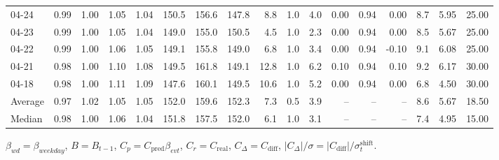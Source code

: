 \begin{threeparttable}
{\begin{tabular}{lrrrrrrrrrrrrrrrr}
  04-24 &         0.99 &           1.00 &          1.05 &          1.04 & 150.5 & 156.6 & 147.8 &        8.8 &                      1.0 &                 4.0 &       0.00 &      0.94 &           0.00 &              8.7 &            5.95 &                  25.00 \\
  04-23 &         0.99 &           1.00 &          1.05 &          1.04 & 149.0 & 155.0 & 150.5 &        4.5 &                      1.0 &                 2.3 &       0.00 &      0.94 &           0.00 &              8.5 &            5.67 &                  25.00 \\
  04-22 &         0.99 &           1.00 &          1.06 &          1.05 & 149.1 & 155.8 & 149.0 &        6.8 &                      1.0 &                 3.4 &       0.00 &      0.94 &          -0.10 &              9.1 &            6.08 &                  25.00 \\
  04-21 &         0.98 &           1.00 &          1.10 &          1.08 & 149.5 & 161.8 & 149.1 &       12.8 &                      1.0 &                 6.2 &       0.10 &      0.94 &           0.10 &              9.2 &            6.17 &                  30.00 \\
  04-18 &         0.98 &           1.00 &          1.11 &          1.09 & 147.6 & 160.1 & 149.5 &       10.6 &                      1.0 &                 5.2 &       0.00 &      0.94 &           0.00 &              6.8 &            4.50 &                  30.00 \\
Average &         0.97 &           1.02 &          1.05 &          1.05 & 152.0 & 159.6 & 152.3 &        7.3 &                      0.5 &                 3.9 &         -- &        -- &             -- &              8.6 &            5.67 &                  18.50 \\
 Median &         0.98 &           1.00 &          1.06 &          1.04 & 151.8 & 157.5 & 152.0 &        6.1 &                      1.0 &                 3.1 &         -- &        -- &             -- &              7.4 &            4.95 &                  15.00 \\
\bottomrule
\end{tabular}
}
\begin{tablenotes}\footnotesize
\item $\beta_{wd}=\beta_{weekday}$, $B=B_{t-1}$,
$C_p=C_{\text{pred}}\beta_{evt}$, $C_r=C_{\text{real}}$,
$C_\Delta=C_{\text{diff}}$, $|C_\Delta|/\sigma=|C_{\text{diff}}|/\sigma_t^{\text{shift}}$.
\end{tablenotes}
\end{threeparttable}
\endgroup
